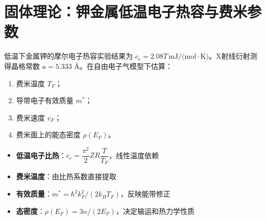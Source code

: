 \section{固体理论：钾金属低温电子热容与费米参数}
\label{sec:potassium-specific-heat}

\begin{modelbox}[题目：由低温电子热容实验估算钾的费米参数]
低温下金属钾的摩尔电子热容实验结果为 $c_e=2.08T\,\text{mJ/(mol}\cdot\text{K)}$。X射线衍射测得晶格常数 $a=5.333$ \AA。在自由电子气模型下估算：
\begin{enumerate}
    \item 费米温度 $T_F$；
    \item 导带电子有效质量 $m^*$；
    \item 费米速度 $v_F$；
    \item 费米面上的能态密度 $\rho(E_F)$。
\end{enumerate}
\end{modelbox}

\begin{tipbox}[考点快速分析]
\begin{itemize}
    \item \textbf{低温电子比热}：$c_e=\dfrac{\pi^2}{2}ZR\dfrac{T}{T_F}$，线性温度依赖
    \item \textbf{费米温度}：由比热系数直接提取
    \item \textbf{有效质量}：$m^*=\hbar^2k_F^2/(2k_BT_F)$，反映能带修正
    \item \textbf{态密度}：$\rho(E_F)=3n/(2E_F)$，决定输运和热力学性质
\end{itemize}
\end{tipbox}

